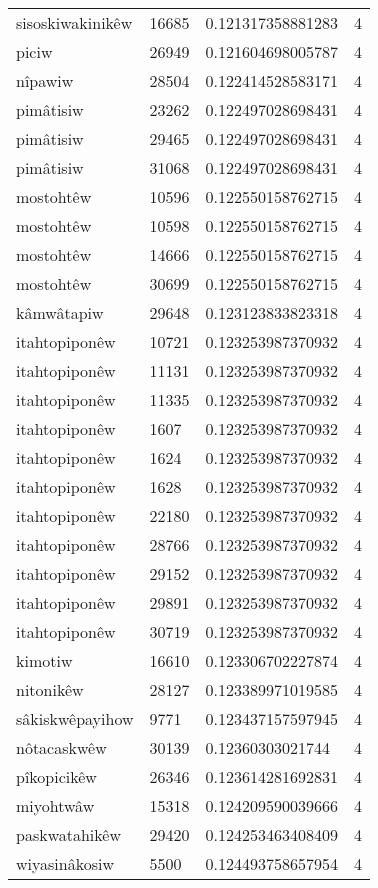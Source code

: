 \begin{longtable}{llll}
sisoskiwakinikêw & 16685 & 0.121317358881283 & 4 \\
piciw & 26949 & 0.121604698005787 & 4 \\
nîpawiw & 28504 & 0.122414528583171 & 4 \\
pimâtisiw & 23262 & 0.122497028698431 & 4 \\
pimâtisiw & 29465 & 0.122497028698431 & 4 \\
pimâtisiw & 31068 & 0.122497028698431 & 4 \\
mostohtêw & 10596 & 0.122550158762715 & 4 \\
mostohtêw & 10598 & 0.122550158762715 & 4 \\
mostohtêw & 14666 & 0.122550158762715 & 4 \\
mostohtêw & 30699 & 0.122550158762715 & 4 \\
kâmwâtapiw & 29648 & 0.123123833823318 & 4 \\
itahtopiponêw & 10721 & 0.123253987370932 & 4 \\
itahtopiponêw & 11131 & 0.123253987370932 & 4 \\
itahtopiponêw & 11335 & 0.123253987370932 & 4 \\
itahtopiponêw & 1607 & 0.123253987370932 & 4 \\
itahtopiponêw & 1624 & 0.123253987370932 & 4 \\
itahtopiponêw & 1628 & 0.123253987370932 & 4 \\
itahtopiponêw & 22180 & 0.123253987370932 & 4 \\
itahtopiponêw & 28766 & 0.123253987370932 & 4 \\
itahtopiponêw & 29152 & 0.123253987370932 & 4 \\
itahtopiponêw & 29891 & 0.123253987370932 & 4 \\
itahtopiponêw & 30719 & 0.123253987370932 & 4 \\
kimotiw & 16610 & 0.123306702227874 & 4 \\
nitonikêw & 28127 & 0.123389971019585 & 4 \\
sâkiskwêpayihow & 9771 & 0.123437157597945 & 4 \\
nôtacaskwêw & 30139 & 0.12360303021744 & 4 \\
pîkopicikêw & 26346 & 0.123614281692831 & 4 \\
miyohtwâw & 15318 & 0.124209590039666 & 4 \\
paskwatahikêw & 29420 & 0.124253463408409 & 4 \\
wiyasinâkosiw & 5500 & 0.124493758657954 & 4 \\

\end{longtable}
